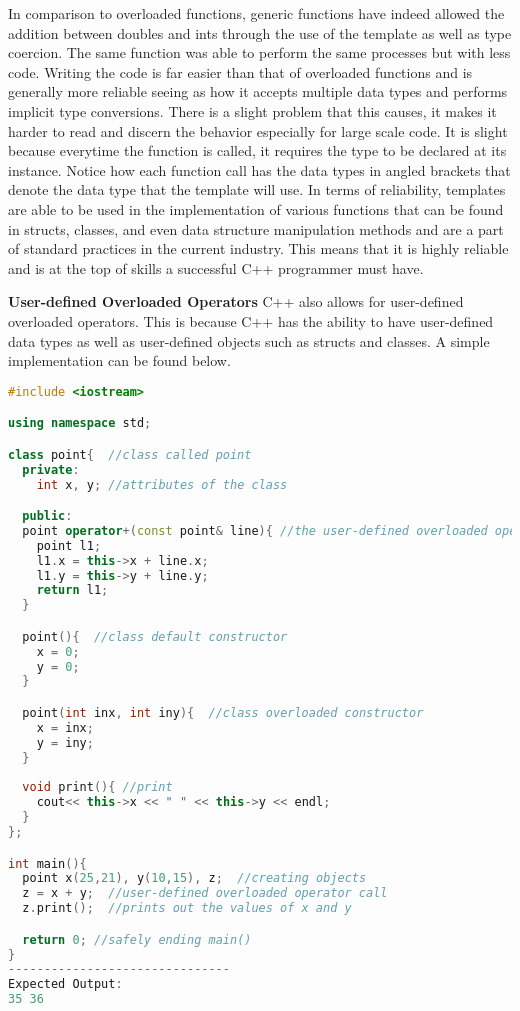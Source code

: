 \documentclass[12pt]{article}
\begin{document}
In comparison to overloaded functions, generic functions have indeed allowed the addition between doubles and ints through the use of the template as well as type coercion. The same function was able to perform the same processes but with less code. Writing the code is far easier than that of overloaded functions and is generally more reliable seeing as how it accepts multiple data types and performs implicit type conversions. There is a slight problem that this causes, it makes it harder to read and discern the behavior especially for large scale code. It is slight because everytime the function is called, it requires the type to be declared at its instance. Notice how each function call has the data types in angled brackets that denote the data type that the template will use. In terms of reliability, templates are able to be used in the implementation of various functions that can be found in structs, classes, and even data structure manipulation methods and are a part of standard practices in the current industry. This means that it is highly reliable and is at the top of skills a successful C++ programmer must have. 

\textbf{User-defined Overloaded Operators} C++ also allows for user-defined overloaded operators. This is because C++ has the ability to have user-defined data types as well as user-defined objects such as structs and classes. A simple implementation can be found below.

\begin{lstlisting}[language=C++]
  #include <iostream>

using namespace std;

class point{  //class called point
  private:
    int x, y; //attributes of the class

  public:
  point operator+(const point& line){ //the user-defined overloaded operator
    point l1;
    l1.x = this->x + line.x;
    l1.y = this->y + line.y;
    return l1;
  }

  point(){  //class default constructor
    x = 0;
    y = 0;
  }

  point(int inx, int iny){  //class overloaded constructor
    x = inx;
    y = iny;
  }
  
  void print(){ //print
    cout<< this->x << " " << this->y << endl;
  }
};

int main(){
  point x(25,21), y(10,15), z;  //creating objects
  z = x + y;  //user-defined overloaded operator call
  z.print();  //prints out the values of x and y

  return 0; //safely ending main()
}
-------------------------------
Expected Output:
35 36
\end{lstlisting}
\end{document}
